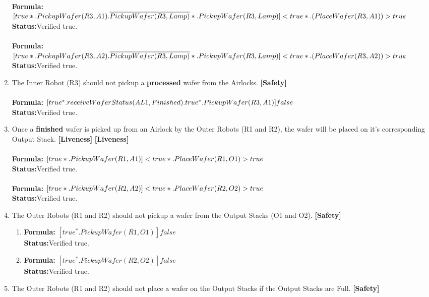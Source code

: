 \documentclass[a4paper,12pt]{article}
\begin{document}
\begin{enumerate}
		\\\textbf{Formula:} $[true*.PickupWafer(R3,A1).\overline{PickupWafer(R3,Lamp)}*.\\PickupWafer(R3, Lamp)] <true*.(PlaceWafer(R3, A1))> true$
		\\\textbf{Status:}Verified true.
		\\
		\\\textbf{Formula:} $[true*.PickupWafer(R3,A2).\overline{PickupWafer(R3,Lamp)}*.\\PickupWafer(R3, Lamp)] <true*.(PlaceWafer(R3, A2))> true$
		\\\textbf{Status:}Verified true.
		\item The Inner Robot (R3) should not pickup a \textbf{processed} wafer from the Airlocks. \textbf{[Safety]}
		\\
		\\\textbf{Formula:} $[true^*. receiveWaferStatus(AL1, Finished). true^*. 
		\\PickupWafer(R3, A1)] false $
		\\\textbf{Status:}Verified true.
		\item Once a \textbf{finished} wafer is picked up from an Airlock by the Outer Robots (R1 and R2), the wafer will be placed on it's corresponding Output Stack. \textbf{[Liveness]} \textbf{[Liveness]}
		\\
		\\\textbf{Formula:} $[true*.PickupWafer(R1, A1)] <true*.\\PlaceWafer(R1,O1)>true$
		\\\textbf{Status:}Verified true.
		\\
		\\\textbf{Formula:} $[true*.PickupWafer(R2, A2)] <true*.\\PlaceWafer(R2,O2)> true$
		\\\textbf{Status:}Verified true.
		\item The Outer Robots (R1 and R2) should not pickup a wafer from the Output Stacks (O1 and O2). \textbf{[Safety]}
		\begin{enumerate}
			\item \textbf{Formula:} $[true^* . PickupWafer(R1, O1)] false$
			\\\textbf{Status:}Verified true.
			\item \textbf{Formula:} $[true^* . PickupWafer(R2, O2)] false$
			\\\textbf{Status:}Verified true.
		\end{enumerate}
		\item The Outer Robots (R1 and R2) should not place a wafer on the Output Stacks if the Output Stacks are Full. \textbf{[Safety]}
		\begin{enumerate}
			

\end{enumerate}
\end{enumerate}
\end{document}
